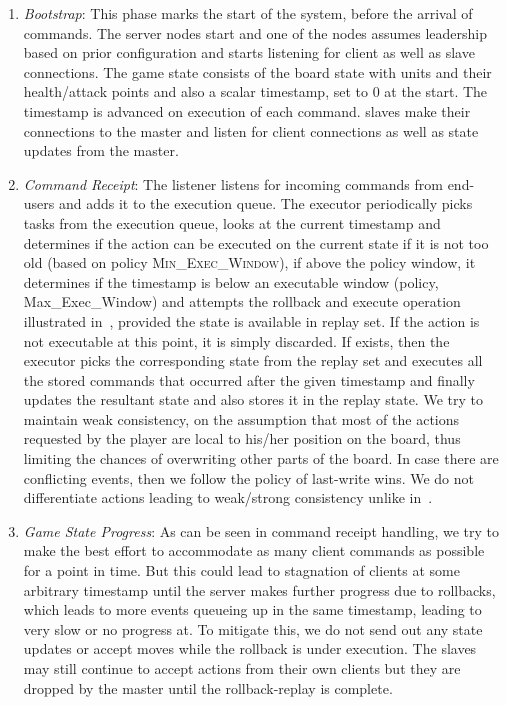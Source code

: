 \documentclass[a4paper]{IEEEtran}
\begin{document}
  \begin{enumerate}
    \item \emph{Bootstrap}: This phase marks the start of the system, before the arrival of commands. The server nodes start and one of the nodes assumes leadership based on prior configuration and starts listening for client as well as slave connections. The game state consists of the board state with units and their health/attack points and also a scalar timestamp, set to 0 at the start. The timestamp is advanced on execution of each command. slaves make their connections to the master and listen for client connections as well as state updates from the master. 
  
    \item \emph{Command Receipt}: The listener listens for incoming commands from end-users and adds it to the execution queue. The executor periodically picks tasks from the execution queue, looks at the current timestamp and determines if the action can be executed on the current state if it is not too old (based on policy \textsc{Min\_Exec\_Window}), if above the policy window, it determines if the timestamp is below an executable window (policy, Max\_Exec\_Window) and attempts the rollback and execute operation illustrated in~\cite{cronin2004efficient}, provided the state is available in replay set. If the action is not executable at this point, it is simply discarded. If exists, then the executor picks the corresponding state from the replay set and executes all the stored commands that occurred after the given timestamp and finally updates the resultant state and also stores it in the replay state. We try to maintain weak consistency, on the assumption that most of the actions requested by the player are local to his/her position on the board, thus limiting the chances of overwriting other parts of the board. In case there are conflicting events, then we follow the policy of last-write wins. We do not differentiate actions leading to weak/strong consistency unlike in~\cite{cronin2004efficient}.

    \item \emph{Game State Progress}: As can be seen in command receipt handling, we try to make the best effort to accommodate as many client commands as possible for a point in time. But this could lead to stagnation of clients at some arbitrary timestamp until the server makes further progress due to rollbacks, which leads to more events queueing up in the same timestamp, leading to very slow or no progress at. To mitigate this, we do not send out any state updates or accept moves while the rollback is under execution. The slaves may still continue to accept actions from their own clients but they are dropped by the master until the rollback-replay is complete.


\end{enumerate}
\end{document}
